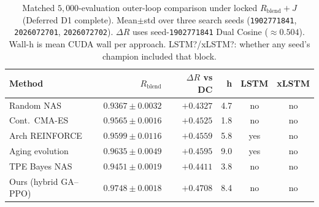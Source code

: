 \begin{table}[t]
  \centering
  \caption{Matched $5{,}000$-evaluation outer-loop comparison under locked $R_{\mathrm{blend}}{+}J$ (Deferred D1 complete).
    Mean$\pm$std over three search seeds (\texttt{1902771841}, \texttt{2026072701}, \texttt{2026072702}).
    $\Delta R$ uses seed-\texttt{1902771841} Dual Cosine (${\approx}0.504$). Wall-h is mean CUDA wall per approach.
    LSTM?/xLSTM?: whether any seed's champion included that block.}
  \label{tab:meta-approaches}
  \setlength{\tabcolsep}{2pt}
  \scriptsize
  \begin{tabular}{@{}lrrrcc@{}}
    \toprule
    Method & $R_{\mathrm{blend}}$ & $\Delta R$ vs DC & h & LSTM & xLSTM \\
    \midrule
    Random NAS & $0.9367{\pm}0.0032$ & $+0.4327$ & 4.7 & no & no \\
    Cont.\ CMA-ES & $0.9565{\pm}0.0016$ & $+0.4525$ & 1.8 & no & no \\
    Arch REINFORCE & $0.9599{\pm}0.0116$ & $+0.4559$ & 5.8 & yes & no \\
    Aging evolution & $0.9635{\pm}0.0049$ & $+0.4595$ & 9.0 & yes & no \\
    TPE Bayes NAS & $0.9451{\pm}0.0019$ & $+0.4411$ & 3.8 & no & no \\
    Ours (hybrid GA--PPO) & $0.9748{\pm}0.0018$ & $+0.4708$ & 8.4 & no & no \\
    \bottomrule
  \end{tabular}
\end{table}
